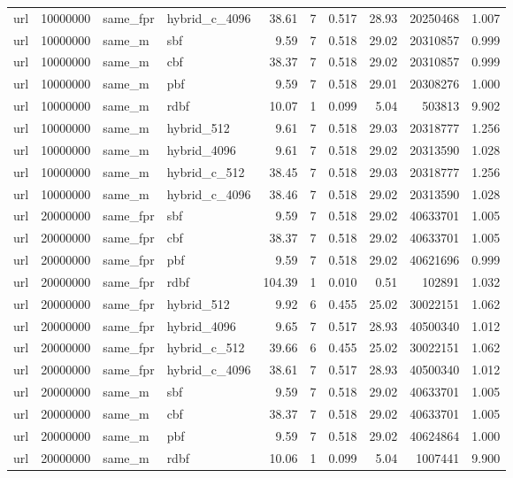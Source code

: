 \begin{tabular}{llllrrrrrr}
url & 10000000 & same\_fpr & hybrid\_c\_4096 & 38.61 & 7 & 0.517 & 28.93 & 20250468 & 1.007 \\
url & 10000000 & same\_m & sbf & 9.59 & 7 & 0.518 & 29.02 & 20310857 & 0.999 \\
url & 10000000 & same\_m & cbf & 38.37 & 7 & 0.518 & 29.02 & 20310857 & 0.999 \\
url & 10000000 & same\_m & pbf & 9.59 & 7 & 0.518 & 29.01 & 20308276 & 1.000 \\
url & 10000000 & same\_m & rdbf & 10.07 & 1 & 0.099 & 5.04 & 503813 & 9.902 \\
url & 10000000 & same\_m & hybrid\_512 & 9.61 & 7 & 0.518 & 29.03 & 20318777 & 1.256 \\
url & 10000000 & same\_m & hybrid\_4096 & 9.61 & 7 & 0.518 & 29.02 & 20313590 & 1.028 \\
url & 10000000 & same\_m & hybrid\_c\_512 & 38.45 & 7 & 0.518 & 29.03 & 20318777 & 1.256 \\
url & 10000000 & same\_m & hybrid\_c\_4096 & 38.46 & 7 & 0.518 & 29.02 & 20313590 & 1.028 \\
url & 20000000 & same\_fpr & sbf & 9.59 & 7 & 0.518 & 29.02 & 40633701 & 1.005 \\
url & 20000000 & same\_fpr & cbf & 38.37 & 7 & 0.518 & 29.02 & 40633701 & 1.005 \\
url & 20000000 & same\_fpr & pbf & 9.59 & 7 & 0.518 & 29.02 & 40621696 & 0.999 \\
url & 20000000 & same\_fpr & rdbf & 104.39 & 1 & 0.010 & 0.51 & 102891 & 1.032 \\
url & 20000000 & same\_fpr & hybrid\_512 & 9.92 & 6 & 0.455 & 25.02 & 30022151 & 1.062 \\
url & 20000000 & same\_fpr & hybrid\_4096 & 9.65 & 7 & 0.517 & 28.93 & 40500340 & 1.012 \\
url & 20000000 & same\_fpr & hybrid\_c\_512 & 39.66 & 6 & 0.455 & 25.02 & 30022151 & 1.062 \\
url & 20000000 & same\_fpr & hybrid\_c\_4096 & 38.61 & 7 & 0.517 & 28.93 & 40500340 & 1.012 \\
url & 20000000 & same\_m & sbf & 9.59 & 7 & 0.518 & 29.02 & 40633701 & 1.005 \\
url & 20000000 & same\_m & cbf & 38.37 & 7 & 0.518 & 29.02 & 40633701 & 1.005 \\
url & 20000000 & same\_m & pbf & 9.59 & 7 & 0.518 & 29.02 & 40624864 & 1.000 \\
url & 20000000 & same\_m & rdbf & 10.06 & 1 & 0.099 & 5.04 & 1007441 & 9.900 \\

\end{tabular}
